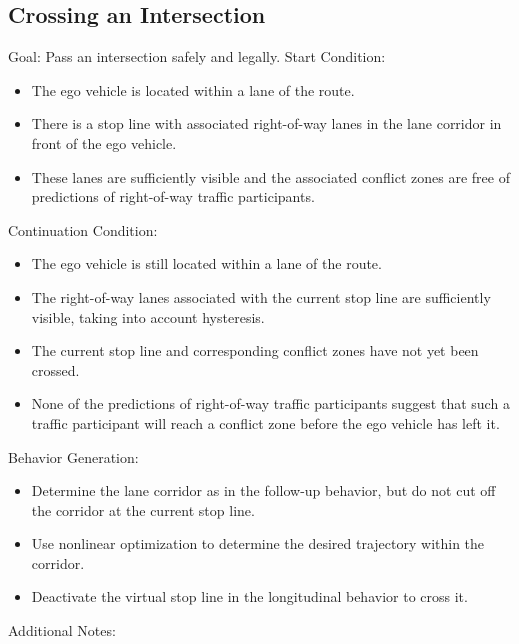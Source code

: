 \subsection{Crossing an Intersection}

    Goal: Pass an intersection safely and legally.
    Start Condition:

\begin{itemize}
    \item The ego vehicle is located within a lane of the route.
    \item There is a stop line with associated right-of-way lanes in the lane corridor in front of the ego vehicle.
    \item These lanes are sufficiently visible and the associated conflict zones are free of predictions of right-of-way traffic participants.
\end{itemize}

    Continuation Condition:

\begin{itemize}
    \item The ego vehicle is still located within a lane of the route.
    \item The right-of-way lanes associated with the current stop line are sufficiently visible, taking into account hysteresis.
    \item The current stop line and corresponding conflict zones have not yet been crossed.
    \item None of the predictions of right-of-way traffic participants suggest that such a traffic participant will reach a conflict zone before the ego vehicle has left it.
\end{itemize}

    Behavior Generation:

\begin{itemize}
    \item Determine the lane corridor as in the follow-up behavior, but do not cut off the corridor at the current stop line.
    \item Use nonlinear optimization to determine the desired trajectory within the corridor.
    \item Deactivate the virtual stop line in the longitudinal behavior to cross it.
\end{itemize}

Additional Notes:

